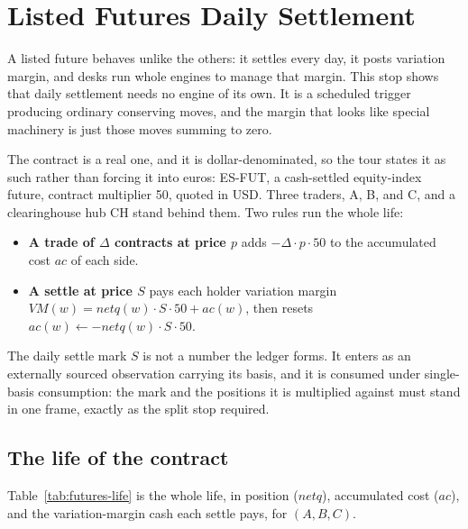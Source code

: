 \section{Listed Futures Daily Settlement}\label{sec:tour-futures}

A listed future behaves unlike the others: it settles every day, it posts
variation margin, and desks run whole engines to manage that margin. This stop shows
that daily settlement needs no engine of its own. It is a scheduled trigger producing
ordinary conserving moves, and the margin that looks like special machinery is just
those moves summing to zero.

The contract is a real one, and it is dollar-denominated, so the tour states it as
such rather than forcing it into euros: ES-FUT, a cash-settled equity-index future,
contract multiplier 50, quoted in USD. Three traders, A, B, and C, and a
clearinghouse hub CH stand behind them. Two rules run the whole life:

\begin{itemize}[leftmargin=1.5em]
\item \textbf{A trade of $\Delta$ contracts at price $p$} adds $-\Delta \cdot p \cdot
50$ to the accumulated cost $ac$ of each side.
\item \textbf{A settle at price $S$} pays each holder variation margin $VM(w) =
\mathit{netq}(w) \cdot S \cdot 50 + ac(w)$, then resets $ac(w) \leftarrow
-\mathit{netq}(w) \cdot S \cdot 50$.
\end{itemize}

The daily settle mark $S$ is not a number the ledger forms. It enters as an externally
sourced observation carrying its basis, and it is consumed under single-basis
consumption: the mark and the positions it is multiplied against must stand in one
frame, exactly as the split stop required.

\subsection{The life of the contract}

Table~\ref{tab:futures-life} is the whole life, in position ($\mathit{netq}$),
accumulated cost ($ac$), and the variation-margin cash each settle pays, for
$(A, B, C)$.

